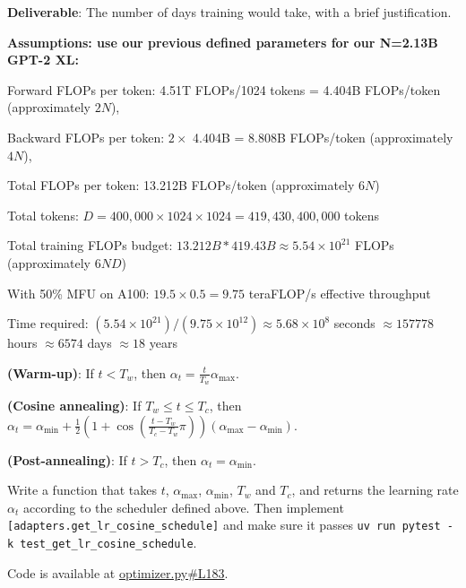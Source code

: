 \begin{enumerate}[label=(\alph*)]
    \textbf{Deliverable}: The number of days training would take, with a brief justification.

    \begin{answer}
    \textbf{Assumptions: use our previous defined parameters for our N=2.13B GPT-2 XL:}
    
    Forward FLOPs per token: 4.51T FLOPs/1024 tokens = 4.404B FLOPs/token (approximately $2N$), 

    Backward FLOPs per token: $2 \times$ 4.404B = 8.808B FLOPs/token (approximately $4N$),

    Total FLOPs per token: 13.212B FLOPs/token (approximately $6N$)

    Total tokens: $D = 400,000 \times 1024 \times 1024 = 419,430,400,000$ tokens

    Total training FLOPs budget: $13.212B * 419.43B \approx 5.54 \times 10^{21}$ FLOPs (approximately $6ND$)

    With 50\% MFU on A100: $19.5 \times 0.5 = 9.75$ teraFLOP/s effective throughput

    Time required: $(5.54 \times 10^{21}) / (9.75 \times 10^{12}) \approx 5.68 \times 10^{8}$ seconds $\approx 157778$ hours  $\approx 6574$ days $\approx 18$ years
    \end{answer}
\end{enumerate}


\textbf{(Warm-up)}: If $t < T_w$, then $\alpha_t = \frac{t}{T_w} \alpha_{\max}$.

\textbf{(Cosine annealing)}: If $T_w \leq t \leq T_c$, then $\alpha_t = \alpha_{\min} + \frac{1}{2}\left(1 + \cos\left(\frac{t - T_w}{T_c - T_w} \pi\right)\right)(\alpha_{\max} - \alpha_{\min})$.

\textbf{(Post-annealing)}: If $t > T_c$, then $\alpha_t = \alpha_{\min}$.

Write a function that takes $t$, $\alpha_{\max}$, $\alpha_{\min}$, $T_w$ and $T_c$, and returns the learning rate $\alpha_t$ according to the scheduler defined above. Then implement \texttt{[adapters.get\_lr\_cosine\_schedule]} and make sure it passes \texttt{uv run pytest -k test\_get\_lr\_cosine\_schedule}.

\begin{answer}
    Code is available at \href{https://github.com/donglinkang2021/assignment1-basics/blob/main/cs336_basics/optimizer.py#L183}{optimizer.py\#L183}.
\end{answer}

